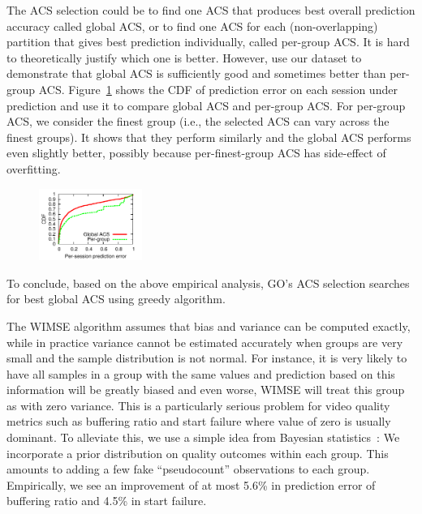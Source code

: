  The ACS selection could be to find one ACS that produces best overall prediction accuracy called global ACS, or to find one ACS for each (non-overlapping) partition that gives best prediction individually, called per-group ACS. It is hard to theoretically justify which one is better. However, use our dataset to demonstrate that global ACS is sufficiently good and sometimes better than per-group ACS.
Figure~\ref{fig:global-acs} shows the CDF of prediction error on each session under prediction and use it to compare global ACS and per-group ACS. For per-group ACS, we consider the finest group (i.e., the selected ACS can vary across the finest groups). It shows that they perform similarly and the global ACS performs even slightly better, possibly because per-finest-group ACS has side-effect of overfitting.

\begin{figure}[h!]
\centering
 \includegraphics[width=0.3\textwidth] {figures/newfig/example-granular-metric0-new.pdf}
\label{fig:global-acs}
\end{figure}


To conclude, based on the above empirical analysis, GO's ACS selection searches for best global ACS using greedy algorithm. 


\label{subsec:sudo}
The WIMSE algorithm assumes that bias and variance can be computed exactly, while in practice variance cannot be estimated accurately when groups are very small and the sample distribution is not normal. For instance, it is very likely to have all samples in a group with the same values and prediction based on this information will be greatly biased and even worse, WIMSE will treat this group as with zero variance. This is a particularly serious problem for video quality metrics such as buffering ratio and start failure where value of zero is usually dominant.
To alleviate this, we use a simple idea from Bayesian statistics~\cite{}: We incorporate a prior distribution on quality outcomes within each group.  This amounts to adding a few fake ``pseudocount'' observations to each group.  Empirically, we see an improvement of at most 5.6\% in prediction error of buffering ratio and 4.5\% in start failure.

